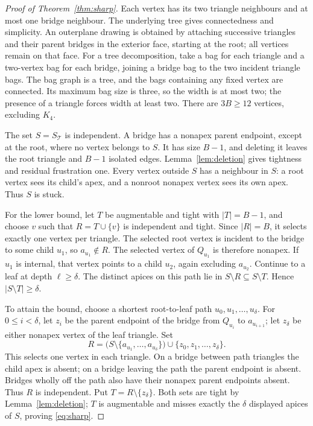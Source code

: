 \documentclass[11pt]{article}
\begin{document}
\begin{proof}[Proof of Theorem~\ref{thm:sharp}]
Each vertex has its two triangle neighbours and at most one bridge
neighbour. The underlying tree gives connectedness and simplicity.
An outerplane drawing is obtained by attaching successive triangles
and their parent bridges in the exterior face, starting at the root;
all vertices remain on that face. For a tree decomposition, take a bag
for each triangle and a two-vertex bag for each bridge, joining a bridge
bag to the two incident triangle bags. The bag graph is a tree, and
the bags containing any fixed vertex are connected. Its maximum bag
size is three, so the width is at most two; the presence of a triangle
forces width at least two. There are $3B\geq12$ vertices, excluding $K_4$.

The set $S=S_{\mathcal T}$ is independent. A bridge has a nonapex
parent endpoint, except at the root, where no vertex belongs to $S$.
It has size $B-1$, and deleting it leaves the root triangle and
$B-1$ isolated edges. Lemma~\ref{lem:deletion} gives tightness and
residual frustration one. Every vertex outside $S$ has a neighbour in
$S$: a root vertex sees its child's apex, and a nonroot nonapex vertex
sees its own apex. Thus $S$ is stuck.

For the lower bound, let $T$ be augmentable and tight with $|T|=B-1$,
and choose $v$ such that $R=T\cup\{v\}$ is independent and tight.
Since $|R|=B$, it selects exactly one vertex per triangle. The selected
root vertex is incident to the bridge to some child $u_1$, so
$a_{u_1}\notin R$. The selected vertex of $Q_{u_1}$ is therefore
nonapex. If $u_1$ is internal, that vertex points to a child $u_2$,
again excluding $a_{u_2}$. Continue to a leaf at depth $\ell\geq\delta$.
The distinct apices on this path lie in
$S\setminus R\subseteq S\setminus T$. Hence $|S\setminus T|\geq\delta$.

To attain the bound, choose a shortest root-to-leaf path
$u_0,u_1,\ldots,u_\delta$. For $0\leq i<\delta$, let $z_i$ be the
parent endpoint of the bridge from $Q_{u_i}$ to $a_{u_{i+1}}$; let
$z_\delta$ be either nonapex vertex of the leaf triangle. Set
\[
 R=\bigl(S\setminus\{a_{u_1},\ldots,a_{u_\delta}\}\bigr)
       \cup\{z_0,z_1,\ldots,z_\delta\}.
\]
This selects one vertex in each triangle. On a bridge between path
triangles the child apex is absent; on a bridge leaving the path the
parent endpoint is absent. Bridges wholly off the path also have their
nonapex parent endpoints absent. Thus $R$ is independent.
Put $T=R\setminus\{z_\delta\}$. Both sets are tight by
Lemma~\ref{lem:deletion}; $T$ is augmentable and misses exactly the
$\delta$ displayed apices of $S$, proving \eqref{eq:sharp}.


\end{proof}
\end{document}
